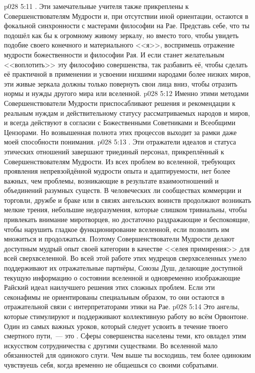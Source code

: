 \vs p028 5:11 . Эти замечательные учителя также прикреплены к Совершенствователям Мудрости и, при отсутствии иной ориентации, остаются в фокальной синхронности с мастерами философии на Рае. Представь себе, что ты подошёл как бы к огромному живому зеркалу, но вместо того, чтобы увидеть подобие своего конечного и материального <<я>>, воспримешь отражение мудрости божественности и философии Рая. И если станет желательным <<воплотить>> эту философию совершенства, так разбавить её, чтобы сделать её практичной в применении и усвоении низшими народами более низких миров, эти живые зеркала должны только повернуть свои лица вниз, чтобы отразить нормы и нужды другого мира или вселенной.
\vs p028 5:12 Именно этими методами Совершенствователи Мудрости приспосабливают решения и рекомендации к реальным нуждам и действительному статусу рассматриваемых народов и миров, и всегда действуют в согласии с Божественными Советниками и Всеобщими Цензорами. Но возвышенная полнота этих процессов выходит за рамки даже моей способности понимания.
\vs p028 5:13 . Эти отражатели идеалов и статуса этических отношений завершают триединый персонал, прикреплённый к Совершенствователям Мудрости. Из всех проблем во вселенной, требующих проявления непревзойдённой мудрости опыта и адаптируемости, нет более важных, чем проблемы, возникающие в результате взаимоотношений и объединений разумных существ. В человеческих ли сообществах коммерции и торговли, дружбе и браке или в связях ангельских воинств продолжают возникать мелкие трения, небольшие недоразумения, которые слишком тривиальны, чтобы привлекать внимание миротворцев, но достаточно раздражающие и беспокоящие, чтобы нарушить гладкое функционирование вселенной, если позволить им множиться и продолжаться. Поэтому Совершенствователи Мудрости делают доступным мудрый опыт своей категории в качестве <<елея примирения>> для всей сверхвселенной. Во всей этой работе этих мудрецов сверхвселенных умело поддерживают их отражательные партнёры, Союзы Душ, делающие доступной текущую информацию о состоянии вселенной и одновременно изображающие Райский идеал наилучшего решения этих сложных проблем. Если эти секонафимы не ориентированы специальным образом, то они остаются в отражательной связи с интерпретаторами этики на Рае.
\vs p028 5:14 \pc Это ангелы, которые стимулируют и поддерживают коллективную работу во всём Орвонтоне. Один из самых важных уроков, который следует усвоить в течение твоего смертного пути,~--- это . Сферы совершенства населены теми, кто овладел этим искусством сотрудничества с другими существами. Во вселенной мало обязанностей для одинокого слуги. Чем выше ты восходишь, тем более одиноким чувствуешь себя, когда временно не общаешься со своими собратьями.
